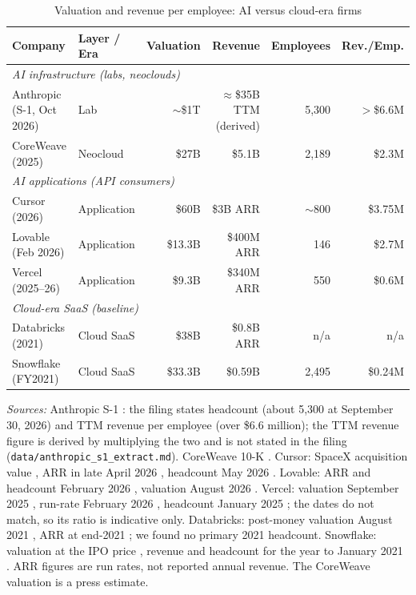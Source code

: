 \begin{table}[h]
  \centering
  \caption{Valuation and revenue per employee: AI versus cloud-era firms}
  \label{tab:ai-vs-cloud}
  \small
  \setlength{\tabcolsep}{4pt}
  \begin{tabular}{llrrrr}
    \toprule
    Company & Layer / Era & Valuation & Revenue & Employees & Rev./Emp. \\
    \midrule
    \multicolumn{6}{l}{\textit{AI infrastructure (labs, neoclouds)}} \\
    Anthropic (S-1, Oct 2026) & Lab & $\sim$\$1T & $\approx$\$35B TTM (derived) & 5,300 & $>$\$6.6M \\
    CoreWeave (2025) & Neocloud & \$27B & \$5.1B & 2,189 & \$2.3M \\
    \midrule
    \multicolumn{6}{l}{\textit{AI applications (API consumers)}} \\
    Cursor (2026) & Application & \$60B & \$3B ARR & $\sim$800 & \$3.75M \\
    Lovable (Feb 2026) & Application & \$13.3B & \$400M ARR & 146 & \$2.7M \\
    Vercel (2025--26) & Application & \$9.3B & \$340M ARR & 550 & \$0.6M \\
    \midrule
    \multicolumn{6}{l}{\textit{Cloud-era SaaS (baseline)}} \\
    Databricks (2021) & Cloud SaaS & \$38B & \$0.8B ARR & n/a & n/a \\
    Snowflake (FY2021) & Cloud SaaS & \$33.3B & \$0.59B & 2,495 & \$0.24M \\
    \bottomrule
  \end{tabular}
  \par\smallskip
  \parbox{\linewidth}{\footnotesize \textit{Sources:} Anthropic S-1 \citep{anthropic2026s1}: the filing states headcount (about 5,300 at September 30, 2026) and TTM revenue per employee (over \$6.6 million); the TTM revenue figure is derived by multiplying the two and is not stated in the filing (\texttt{data/anthropic\_s1\_extract.md}). CoreWeave 10-K \citep{coreweave2026tenk}. Cursor: SpaceX acquisition value \citep{spacex2026cursorclose}, ARR in late April 2026 \citep{metz2026cursor}, headcount May 2026 \citep{bi2026cursorhiring}. Lovable: ARR and headcount February 2026 \citep{heim2026lovable}, valuation August 2026 \citep{bort2026lovable}. Vercel: valuation September 2025 \citep{vercel2025seriesf}, run-rate February 2026 \citep{temkin2026vercel}, headcount January 2025 \citep{garfinkle2025vercel}; the dates do not match, so its ratio is indicative only. Databricks: post-money valuation August 2021 \citep{databricks2021seriesh}, ARR at end-2021 \citep{wilhelm2022databricks}; we found no primary 2021 headcount. Snowflake: valuation at the IPO price \citep{levy2020snowflake}, revenue and headcount for the year to January 2021 \citep{snowflake2021tenk}. ARR figures are run rates, not reported annual revenue. The CoreWeave valuation is a press estimate.}
\end{table}


